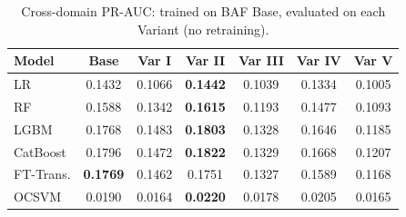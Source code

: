 \begin{table}[ht!]
\centering
\caption{Cross-domain PR-AUC: trained on BAF Base, evaluated on each Variant (no retraining).}
\label{tab:crossdomain_prauc}
\begin{tabular}{l c c c c c c}
\toprule
Model & Base & Var I & Var II & Var III & Var IV & Var V \\
\midrule
LR         & 0.1432 & 0.1066 & \textbf{0.1442} & 0.1039 & 0.1334 & 0.1005 \\
RF         & 0.1588 & 0.1342 & \textbf{0.1615} & 0.1193 & 0.1477 & 0.1093 \\
LGBM       & 0.1768 & 0.1483 & \textbf{0.1803} & 0.1328 & 0.1646 & 0.1185 \\
CatBoost   & 0.1796 & 0.1472 & \textbf{0.1822} & 0.1329 & 0.1668 & 0.1207 \\
FT-Trans.  & \textbf{0.1769} & 0.1462 & 0.1751 & 0.1327 & 0.1589 & 0.1168 \\
OCSVM      & 0.0190 & 0.0164 & \textbf{0.0220} & 0.0178 & 0.0205 & 0.0165 \\
\bottomrule
\end{tabular}
\end{table}
